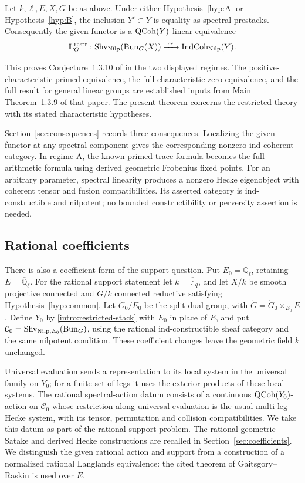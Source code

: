 \begin{theorem}\label{thm:full-support}
Let $k,\ell,E,X,G$ be as above. Under either
Hypothesis~\ref{hyp:A} or Hypothesis~\ref{hyp:B}, the inclusion
$Y'\subset Y$ is equality as spectral prestacks. Consequently the
given functor is a $\operatorname{QCoh}(Y)$-linear equivalence
\[
 \mathbb L_G^{\mathrm{restr}}:
 \operatorname{Shv}_{\operatorname{Nilp}}(\operatorname{Bun}_G(X))\xrightarrow{\ \sim\ }
 \operatorname{IndCoh}_{\operatorname{Nilp}}(Y).
\]
\end{theorem}

This proves Conjecture~1.3.10 of \cite{GR} in the two displayed
regimes. The positive-characteristic primed equivalence, the full
characteristic-zero equivalence, and the full result for general linear
groups are established inputs from Main Theorem~1.3.9 of that paper.
The present theorem concerns the restricted theory with its stated
characteristic hypotheses.

Section~\ref{sec:consequences} records three consequences. Localizing
the given functor at any spectral component gives the corresponding
nonzero ind-coherent category. In regime A, the known primed trace
formula becomes the full arithmetic formula using derived geometric
Frobenius fixed points. For an arbitrary parameter, spectral linearity
produces a nonzero Hecke eigenobject with coherent tensor and fusion
compatibilities. Its asserted category is ind-constructible and
nilpotent; no bounded constructibility or perversity assertion is needed.

\subsection{Rational coefficients}

There is also a coefficient form of the support question. Put
$E_0=\mathbb Q_\ell$, retaining $E=\overline{\mathbb Q}_\ell$.
For the rational support statement let $k=\overline{\mathbb F}_q$, and let $X/k$ be
smooth projective connected and $G/k$ connected reductive satisfying
Hypothesis~\ref{hyp:common}. Let $\check G_0/E_0$ be the split dual group,
with $\check G=\check G_0\times_{E_0}E$. Define $Y_0$ by
\eqref{intro:restricted-stack} with $E_0$ in place of $E$, and put
$\mathcal C_0=\operatorname{Shv}_{\operatorname{Nilp},E_0}(\operatorname{Bun}_G)$, using the rational
ind-constructible sheaf category and the same nilpotent condition.
These coefficient changes leave the geometric field $k$ unchanged.

Universal evaluation sends a representation to its local system in the
universal family on $Y_0$; for a finite set of legs it uses the exterior
products of these local systems. The rational spectral-action datum
consists of a continuous
$\operatorname{QCoh}(Y_0)$-action on $\mathcal C_0$ whose restriction along universal
evaluation is the usual multi-leg Hecke system, with its tensor,
permutation and collision compatibilities. We take this datum as part
of the rational support problem. The rational geometric Satake and
derived Hecke constructions are recalled in Section~\ref{sec:coefficients}.
We distinguish the given rational action and support from a construction
of a normalized rational Langlands equivalence: the cited theorem of
Gaitsgory--Raskin is used over $E$.

